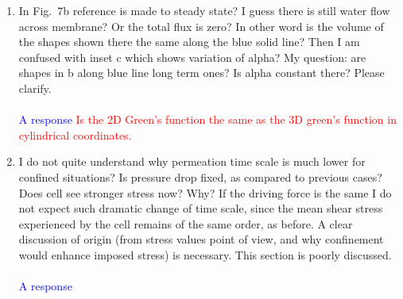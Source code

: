 \documentclass[11pt]{article}
\newcommand{\response}[1]{\textcolor{blue}{#1}}
\newcommand{\note}[1]{\textcolor{red}{#1}}
\begin{document}
\begin{enumerate}
  \item In Fig.~7b reference is made to steady state? I guess there is
    still water flow across membrane? Or the total flux is zero? In
    other word is the volume of the shapes shown there the same along
    the blue solid line? Then I am confused with inset c which shows
    variation of alpha? My question: are shapes in b along blue line
    long term ones? Is alpha constant there? Please clarify. \\ \\
    \response{A response}
    \note{Is the 2D Green's function the same as the 3D green's function
    in cylindrical coordinates.}

  \item I do not quite understand why permeation time scale is much
    lower for confined situations? Is pressure drop fixed, as compared
    to previous cases? Does cell see stronger stress now? Why? If the
    driving force is the same I do not expect such dramatic change of
    time scale, since the mean shear stress experienced by the cell
    remains of the same order, as before. A clear discussion of origin
    (from stress values point of view, and why confinement would enhance
    imposed stress) is necessary. This section is poorly discussed. \\
    \\
    \response{A response}

\end{enumerate}
\end{document}
